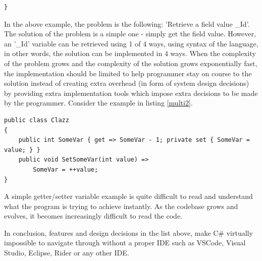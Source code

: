 \documentclass{article}
\begin{document}
\begin{itemize}
\begin{lstlisting}[frame=single, label=multi1, caption=Example C\# File notok.cs]
}
          \end{lstlisting}
          In the above example, the problem is the following: 'Retrieve a field value \_Id'.
          The solution of the problem is a simple one - simply get the field value. However, an '\_Id' variable can be retrieved using 1 of 4 ways, using syntax of the language, in other words, the solution can be implemented in 4 ways. When the complexity of the problem grows and the complexity of the solution grows exponentially fast, the implementation should be limited to help programmer stay on course to the solution instead of creating extra overhead (in form of system design decisions) by providing extra implementation tools which impose extra decisions to be made by the programmer. Consider the example in listing \ref*{multi2}.
          \begin{lstlisting}[frame=single, label=multi2, caption=Simple get/set Example C\# File reallynotok.cs]
public class Clazz
{
    public int SomeVar { get => SomeVar - 1; private set { SomeVar = value; } }
    public void SetSomeVar(int value) =>
        SomeVar = ++value;
}
            \end{lstlisting}
          A simple getter/setter variable example is quite difficult to read and understand what the program is trying to achieve instantly. As the codebase grows and evolves, it becomes increasingly difficult to read the code.
\end{itemize}
In conclusion, features and design decisions in the list above, make C\# virtually impossible to navigate through without a proper IDE such as VSCode, Visual Studio, Eclipse, Rider or any other IDE.
\end{document}

